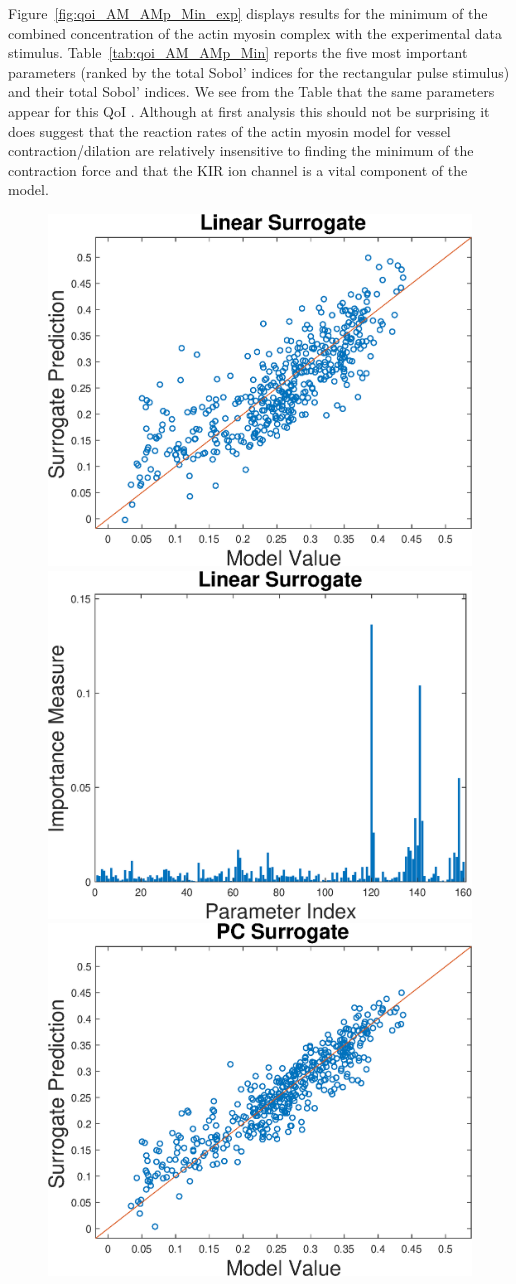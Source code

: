 Figure~\ref{fig:qoi_AM_AMp_Min_exp} displays results for the minimum of the combined concentration of the actin myosin complex with the experimental data stimulus. Table~\ref{tab:qoi_AM_AMp_Min} reports the five most important parameters (ranked by the total Sobol' indices for the rectangular pulse stimulus) and their total Sobol' indices. We see from the Table that the same parameters appear for this QoI . Although at first analysis this should not be surprising it does suggest that the reaction rates of the actin myosin model for vessel contraction/dilation are relatively insensitive to finding the minimum of the contraction force and that the KIR ion channel is a vital component of the model. 
\begin{figure}[h]
\centering
\includegraphics[width=.46 \textwidth]{Figures/AM_AMp_Min_QoI_LR_Prediction_Experimental.eps}
\hspace{.1 cm}
\includegraphics[width=.475 \textwidth]{Figures/AM_AMp_Min_QoI_LR_VI_Experimental.eps} \\
\vspace{.2 cm}
\includegraphics[width=.46 \textwidth]{Figures/AM_AMp_Min_QoI_PCE_Prediction_Experimental.eps}

\end{figure}
